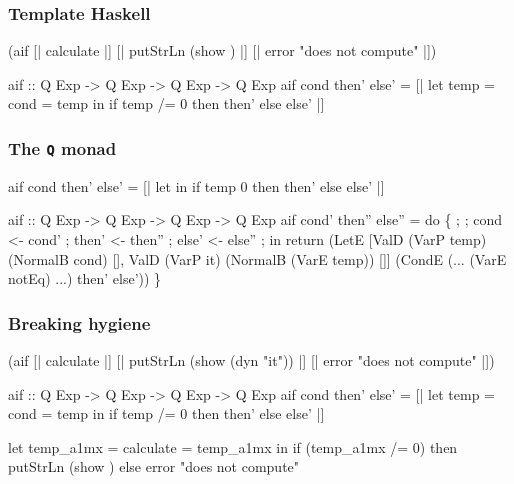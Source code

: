 \documentclass[hyperref={bookmarks=false}]{beamer}
\begin{document}
\begin{frame}[fragile]
\frametitle{Template Haskell}
\begin{semiverbatim}
{\textdollar}(aif [| calculate |]
  [| putStrLn (show ) |]
  [| error "does not compute" |])

aif :: Q Exp -> Q Exp -> Q Exp -> Q Exp
aif cond then' else' =
  [| let temp = {\textdollar}cond
          = temp
     in if temp /= 0 then {\textdollar}then' else {\textdollar}else' |]


\end{semiverbatim}
\end{frame}

\begin{frame}[fragile]
\frametitle{The \texttt{Q} monad}
\begin{semiverbatim}
aif cond then' else' =
  [| let 
     in if temp  0 then {\textdollar}then' else {\textdollar}else' |]

aif :: Q Exp -> Q Exp -> Q Exp -> Q Exp
aif cond' then'' else'' =
    do \{ \text{\color{blue}{temp <- newName "temp"}}
       ; \text{\color{blue}{it <- newName "it"}}
       ; cond <- cond'
       ; then' <- then''
       ; else' <- else''
       ; \text{\color{red}{let notEq = mkNameG_v "ghc-prim" "GHC.Classes" "/="}}
         in return
          (LetE [ValD (VarP temp) (NormalB cond) [],
                 ValD (VarP it) (NormalB (VarE temp)) []]
                (CondE (... (VarE notEq) ...) then' else'))
       \}
\end{semiverbatim}
\end{frame}

\begin{frame}[fragile]
\frametitle{Breaking hygiene}
\begin{semiverbatim}
{\textdollar}(aif [| calculate |]
  [| putStrLn (show \alert{{\textdollar}(dyn "it")}) |]
  [| error "does not compute" |])

aif :: Q Exp -> Q Exp -> Q Exp -> Q Exp
aif cond then' else' =
  [| let temp = {\textdollar}cond
         \text{\color{red}{it}} = temp
     in if temp /= 0 then {\textdollar}then' else {\textdollar}else' |]

let temp_a1mx = calculate
    \text{\color{red}{it_a1my}} = temp_a1mx
in if (temp_a1mx /= 0)
   then putStrLn (show \text{\color{blue}{it_a1my}})
   else error "does not compute"
\end{semiverbatim}
\end{frame}
\end{document}
